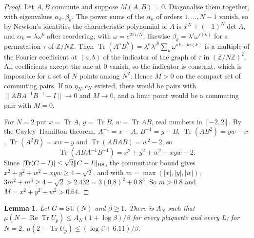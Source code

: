 \documentclass[aps,prd,twocolumn,superscriptaddress,nofootinbib,longbibliography,floatfix,amsmath,amssymb,10pt]{revtex4-2}
\newtheorem{lemma}[theorem]{Lemma}
\theoremstyle{definition}
\theoremstyle{remark}
\newcommand{\Z}{\mathbb{Z}}
\newcommand{\SU}{\mathrm{SU}}
\newcommand{\Tr}{\operatorname{Tr}}
\newcommand{\ReTr}{\operatorname{Re}\operatorname{Tr}}
\begin{document}
\begin{proof}
Let $A,B$ commute and suppose $M(A,B)=0$. Diagonalise them together, with
eigenvalues $\alpha_k,\beta_k$. The power sums of the $\alpha_k$ of orders
$1,\dots,N-1$ vanish, so by Newton's identities the characteristic
polynomial of $A$ is $x^N+(-1)^N\det A$, and $\alpha_k=\lambda\omega^k$ after
reordering, with $\omega=e^{2\pi i/N}$; likewise $\beta_k=\lambda'\omega^{
\tau(k)}$ for a permutation $\tau$ of $\Z/N\Z$. Then $\Tr(A^aB^b)=\lambda^a
\lambda'^b\sum_k\omega^{ak+b\tau(k)}$ is a multiple of the Fourier
coefficient at $(a,b)$ of the indicator of the graph of $\tau$ in $(\Z/N\Z)^2$.
All coefficients except the one at $0$ vanish, so the indicator is
constant, which is impossible for a set of $N$ points among $N^2$. Hence
$M>0$ on the compact set of commuting pairs. If no $\eta_N,c_N$ existed,
there would be pairs with $\lVert ABA^{-1}B^{-1}-I\rVert\to0$ and $M\to0$,
and a limit point would be a commuting pair with $M=0$.

For $N=2$ put $x=\Tr A$, $y=\Tr B$, $w=\Tr AB$, real numbers in $[-2,2]$. By
the Cayley--Hamilton theorem, $A^{-1}=x-A$, $B^{-1}=y-B$, $\Tr(AB^2)=yw-x$,
$\Tr(A^2B)=xw-y$ and $\Tr(ABAB)=w^2-2$, so
\[
\Tr(ABA^{-1}B^{-1})=x^2+y^2+w^2-xyw-2 .
\]
Since $\lvert\Tr(C-I)\rvert\le\sqrt2\lVert C-I\rVert_{\rm HS}$, the
commutator bound gives $x^2+y^2+w^2-xyw\ge4-\sqrt2$, and with $m=\max(\lvert
x\rvert,\lvert y\rvert,\lvert w\rvert)$, $3m^2+m^3\ge4-\sqrt2>2.432=3(0.8)^2+
0.8^3$. So $m>0.8$ and $M=x^2+y^2+w^2>0.64$.
\end{proof}

\begin{lemma}\label{lem:bpflat}
Let $G=\SU(N)$ and $\beta\ge1$. There is $A_N$ such that $\mu(N-\ReTr U_p)\le
A_N(1+\log\beta)/\beta$ for every plaquette and every $L$; for $N=2$,
$\mu(2-\Tr U_p)\le(\log\beta+6.11)/\beta$.
\end{lemma}
\end{document}
